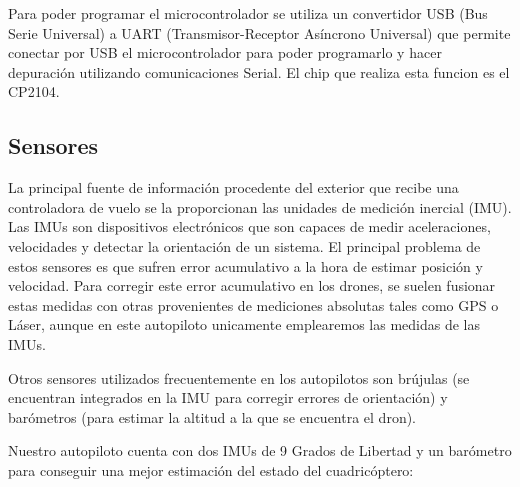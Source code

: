 \par Para poder programar el microcontrolador se utiliza un convertidor USB (Bus Serie Universal) a UART (Transmisor-Receptor Asíncrono Universal) que permite conectar por USB el microcontrolador para poder programarlo y hacer depuración utilizando comunicaciones Serial. El chip que realiza esta funcion es el CP2104.

\subsection{Sensores}
La principal fuente de información procedente del exterior que recibe una controladora de vuelo se la proporcionan las unidades de medición inercial (IMU). Las IMUs son dispositivos electrónicos que son capaces de medir aceleraciones, velocidades y detectar la orientación de un sistema. El principal problema de estos sensores es que sufren error acumulativo a la hora de estimar posición y velocidad. Para corregir este error acumulativo en los drones, se suelen fusionar estas medidas con otras provenientes de mediciones absolutas tales como GPS o Láser, aunque en este autopiloto unicamente emplearemos las medidas de las IMUs.

\par Otros sensores utilizados frecuentemente en los autopilotos son brújulas (se encuentran integrados en la IMU para corregir errores de orientación) y barómetros (para estimar la altitud a la que se encuentra el dron).\\
\medskip

Nuestro autopiloto cuenta con dos IMUs de 9 Grados de Libertad y un barómetro para conseguir una mejor estimación del estado del cuadricóptero:

